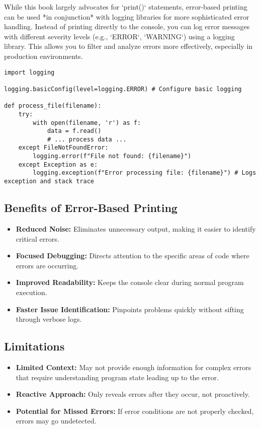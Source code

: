 \documentclass{article}
\begin{document}
{{{While this book largely advocates for `print()` statements, error-based printing can be used *in conjunction* with logging libraries for more sophisticated error handling. Instead of printing directly to the console, you can log error messages with different severity levels (e.g., `ERROR`, `WARNING`) using a logging library. This allows you to filter and analyze errors more effectively, especially in production environments.

\begin{verbatim}
import logging

logging.basicConfig(level=logging.ERROR) # Configure basic logging

def process_file(filename):
    try:
        with open(filename, 'r') as f:
            data = f.read()
            # ... process data ...
    except FileNotFoundError:
        logging.error(f"File not found: {filename}")
    except Exception as e:
        logging.exception(f"Error processing file: {filename}") # Logs exception and stack trace
\end{verbatim}

\subsection*{Benefits of Error-Based Printing}

\begin{itemize}
    \item \textbf{Reduced Noise:} Eliminates unnecessary output, making it easier to identify critical errors.
    \item \textbf{Focused Debugging:} Directs attention to the specific areas of code where errors are occurring.
    \item \textbf{Improved Readability:} Keeps the console clear during normal program execution.
    \item \textbf{Faster Issue Identification:} Pinpoints problems quickly without sifting through verbose logs.
\end{itemize}

\subsection*{Limitations}

\begin{itemize}
    \item \textbf{Limited Context:} May not provide enough information for complex errors that require understanding program state leading up to the error.
    \item \textbf{Reactive Approach:} Only reveals errors after they occur, not proactively.
    \item \textbf{Potential for Missed Errors:} If error conditions are not properly checked, errors may go undetected.
\end{itemize}

}}}
\end{document}
